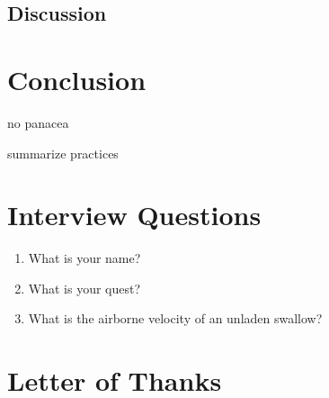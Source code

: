 \documentclass[letterpaper, 10pt]{report}
\begin{document}
\section{Discussion}



\chapter{Conclusion}
no panacea

summarize practices


\appendix
\chapter{Interview Questions}
\begin{enumerate}[leftmargin=*]
	\item What is your name?
	\item What is your quest?
	\item What is the airborne velocity of an unladen swallow?
\end{enumerate}


\chapter{Letter of Thanks}


\printbibliography
{}
{}
\end{document}
